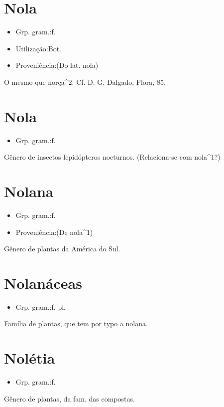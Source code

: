 \section{Nola}
\begin{itemize}
\item {Grp. gram.:f.}
\end{itemize}
\begin{itemize}
\item {Utilização:Bot.}
\end{itemize}
\begin{itemize}
\item {Proveniência:(Do lat. \textunderscore nola\textunderscore )}
\end{itemize}
O mesmo que \textunderscore norça\textunderscore ^2. Cf. D. G. Dalgado, \textunderscore Flora\textunderscore , 85.
\section{Nola}
\begin{itemize}
\item {Grp. gram.:f.}
\end{itemize}
Gênero de insectos lepidópteros nocturnos.
(Relaciona-se com \textunderscore nola\textunderscore ^1?)
\section{Nolana}
\begin{itemize}
\item {Grp. gram.:f.}
\end{itemize}
\begin{itemize}
\item {Proveniência:(De \textunderscore nola\textunderscore ^1)}
\end{itemize}
Gênero de plantas da América do Sul.
\section{Nolanáceas}
\begin{itemize}
\item {Grp. gram.:f. pl.}
\end{itemize}
Família de plantas, que tem por typo a nolana.
\section{Nolétia}
\begin{itemize}
\item {Grp. gram.:f.}
\end{itemize}
Gênero de plantas, da fam. das compostas.
